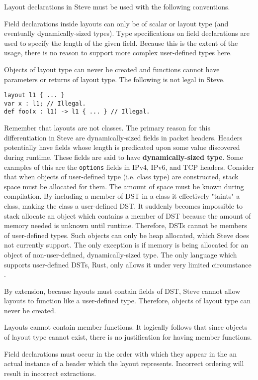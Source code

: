Layout declarations in Steve must be used with the following conventions.

Field declarations inside layouts can only be of scalar or layout type (and eventually dynamically-sized types). Type specifications on field declarations are used to specify the length of the given field. Because this is the extent of the usage, there is no reason to support more complex user-defined types here.

Objects of layout type can never be created and functions cannot have parameters or returns of layout type. The following is not legal in Steve.

\begin{lstlisting}
layout l1 { ... }
var x : l1; // Illegal.
def foo(x : l1) -> l1 { ... } // Illegal.
\end{lstlisting}

Remember that layouts are not classes. The primary reason for this differentiation in Steve are dynamically-sized fields in packet headers. Headers potentially have fields whose length is predicated upon some value discovered during runtime. These fields are said to have \textbf{dynamically-sized type}. Some examples of this are the \texttt{options} fields in IPv4, IPv6, and TCP headers. Consider that when objects of user-defined type (i.e. class type) are constructed, stack space must be allocated for them. The amount of space must be known during compilation. By including a member of DST in a class it effectively "taints" a class, making the class a user-defined DST. It suddenly becomes impossible to stack allocate an object which contains a member of DST because the amount of memory needed is unknown until runtime. Therefore, DSTs cannot be members of user-defined types. Such objects can only be heap allocated, which Steve does not currently support. The only exception is if memory is being allocated for an object of non-user-defined, dynamically-sized type. The only language which supports user-defined DSTs, Rust, only allows it under very limited circumstance \cite{rust_dst_std}.

By extension, because layouts must contain fields of DST, Steve cannot allow layouts to function like a user-defined type. Therefore, objects of layout type can never be created.
  
Layouts cannot contain member functions. It logically follows that since objects of layout type cannot exist, there is no justification for having member functions.

Field declarations must occur in the order with which they appear in the an actual instance of a header which the layout represents. Incorrect ordering will result in incorrect extractions.

